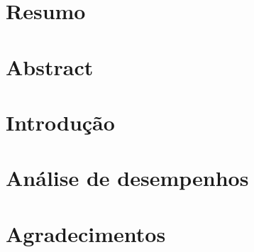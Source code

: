 \documentclass[12pt, a4paper]{report}
\begin{document}
	
	\chapter*{Resumo}
	\chapter*{Abstract}
	\chapter{Introdução}
	
	
	
	
	
	
	
	
	
	
	
	\chapter{Análise de desempenhos}
	\chapter*{Agradecimentos}
	
	
	
	 
\end{document}
